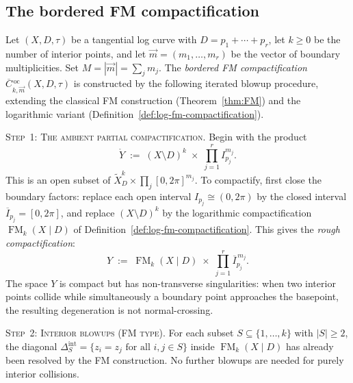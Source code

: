 \subsection{The bordered FM compactification}
\label{subsec:bordered-fm-construction}

\begin{construction}
\label{constr:bordered-fm}
Let $(X, D, \tau)$ be a tangential log curve with
$D = p_1 + \cdots + p_r$, let $k \geq 0$ be the number of
interior points, and let $\vec{m} = (m_1, \ldots, m_r)$ be the
vector of boundary multiplicities. Set $M = |\vec{m}| = \sum_j m_j$.
The \emph{bordered FM compactification}
$\overline{C}{}^{\,\mathrm{oc}}_{k,\vec{m}}(X, D, \tau)$ is
constructed by the following iterated blowup procedure,
extending the classical FM construction
(Theorem~\ref{thm:FM}) and the logarithmic variant
(Definition~\ref{def:log-fm-compactification}).

\medskip
\noindent\textsc{Step~1: The ambient partial compactification.}
Begin with the product
\begin{equation}\label{eq:bordered-ambient}
\mathring{Y}
\;:=\;
(X \setminus D)^k
\;\times\;
\prod_{j=1}^{r}
I_{p_j}^{m_j}.
\end{equation}
This is an open subset of
$\widetilde{X}_D^k \times \prod_j [0, 2\pi]^{m_j}$. To
compactify, first close the boundary factors: replace each open
interval $I_{p_j} \cong (0, 2\pi)$ by the closed interval
$\overline{I}_{p_j} = [0, 2\pi]$, and replace $(X \setminus D)^k$
by the logarithmic compactification
$\operatorname{FM}_k(X \mathbin{|} D)$ of
Definition~\ref{def:log-fm-compactification}. This gives the
\emph{rough compactification}:
\begin{equation}\label{eq:bordered-rough}
Y
\;:=\;
\operatorname{FM}_k(X \mathbin{|} D)
\;\times\;
\prod_{j=1}^{r}
\overline{I}_{p_j}^{\,m_j}.
\end{equation}
The space $Y$ is compact but has non-transverse singularities: when
two interior points collide while simultaneously a boundary point
approaches the basepoint, the resulting degeneration is not
normal-crossing.

\medskip
\noindent\textsc{Step~2: Interior blowups (FM type).}
For each subset $S \subseteq \{1, \ldots, k\}$ with $|S| \geq 2$,
the diagonal $\Delta_S^{\mathrm{int}}
= \{z_i = z_j \text{ for all } i, j \in S\}$ inside
$\operatorname{FM}_k(X \mathbin{|} D)$ has already been resolved
by the FM construction. No further blowups are needed for purely
interior collisions.


\end{construction}
